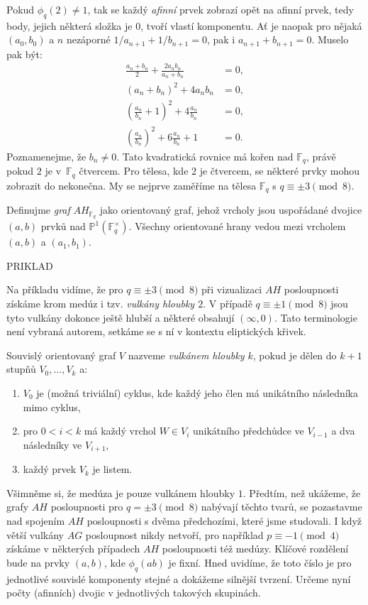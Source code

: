 \documentclass[12pt]{report}
\begin{document}
Pokud $\phi_q(2) \neq 1$, tak se každý \textit{afinní} prvek zobrazí opět na afinní prvek, tedy body, jejich některá složka je $0$, tvoří vlastí komponentu. Ať je naopak pro nějaká $(a_0,b_0)$ a $n$ nezáporné $1/a_{n+1} + 1/b_{n+1} = 0$, pak i $a_{n+1} + b_{n+1} = 0$. Muselo pak být:
\begin{align*}
\frac{a_n+b_n}{2} + \frac{2 a_n b_n}{a_n + b_n} &= 0,\\
(a_n+b_n)^2 + 4 a_n b_n &= 0,\\
\left(\frac{a_n}{b_n} + 1 \right)^2 + 4 \frac{a_n}{b_n} &= 0,\\
\left(\frac{a_n}{b_n}\right)^2 + 6 \frac{a_n}{b_n} + 1 &= 0.
\end{align*}
Poznamenejme, že $b_n \neq 0$. Tato kvadratická rovnice má kořen nad $\mathbb{F}_q$, právě pokud $2$ je v~$\mathbb{F}_q$ čtvercem. Pro tělesa, kde $2$ je čtvercem, se některé prvky mohou zobrazit do nekonečna. My se nejprve zaměříme na tělesa $\mathbb{F}_q$ s $q \equiv \pm 3 \pmod{8}$.

\begin{definice}
Definujme \textit{graf} $AH_{\mathbb{F}_q}$ jako orientovaný graf, jehož vrcholy jsou uspořádané dvojice $(a,b)$ prvků nad $\mathbb{P}^1 (\mathbb{F}_q ^{\times})$. Všechny orientované hrany vedou mezi vrcholem $(a,b)$ a $(a_1,b_1)$.
\end{definice}

PRIKLAD

Na příkladu vidíme, že pro $q \equiv \pm 3 \pmod{8}$ při vizualizaci $AH$ posloupnosti získáme krom medúz i tzv. \textit{vulkány hloubky $2$}. V případě $q \equiv \pm 1 \pmod{8}$ jsou tyto vulkány dokonce ještě hlubší a některé obsahují $(\infty,0)$. Tato terminologie není vybraná autorem, setkáme se s ní v kontextu eliptických křivek.
\begin{definice}
Souvislý orientovaný graf $V$ nazveme \textit{vulkánem hloubky $k$}, pokud je dělen do $k+1$ stupňů $V_0,\dots,V_k$ a:
\begin{enumerate}
\item $V_0$ je (možná triviální) cyklus, kde každý jeho člen má unikátního následníka mimo cyklus,
\item pro $0 <i < k$ má každý vrchol $W \in V_i$ unikátního předchůdce ve $V_{i-1}$ a dva následníky ve $V_{i+1}$,
\item každý prvek $V_k$ je listem.
\end{enumerate}
\end{definice}
Všimněme si, že medúza je pouze vulkánem hloubky $1$. Předtím, než ukážeme, že grafy $AH$ posloupnosti pro $q = \pm 3 \pmod{8}$ nabývají těchto tvarů, se pozastavme nad spojením $AH$ posloupnosti s dvěma předchozími, které jsme studovali. I když větší vulkány $AG$ posloupnost nikdy netvoří, pro například $p \equiv -1 \pmod{4}$ získáme v některých případech $AH$ posloupnosti též medúzy. Klíčové rozdělení bude na prvky $(a,b)$, kde $\phi_q (ab)$ je fixní. Hned uvidíme, že toto číslo je pro jednotlivé souvislé komponenty stejné a dokážeme silnější tvrzení. Určeme nyní počty (afinních) dvojic v jednotlivých takových skupinách.
\end{document}
